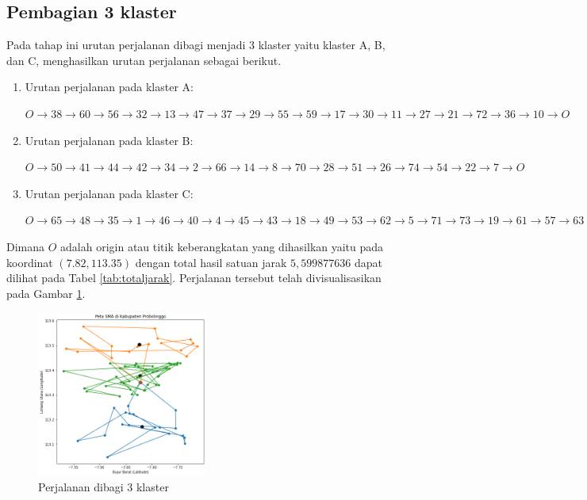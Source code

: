 \subsection{Pembagian 3 klaster}

Pada tahap ini urutan perjalanan dibagi menjadi 3 klaster yaitu klaster A, B, dan C, menghasilkan urutan perjalanan sebagai berikut.

\begin{enumerate}
\item Urutan perjalanan pada klaster A:

$O \to 38 \to 60 \to 56 \to 32 \to 13 \to 47 \to 37 \to 29 \to 55 \to 59 \to 17 \to 30 \to 11 \to 27 \to 21 \to 72 \to 36 \to 10 \to O$

\item Urutan perjalanan pada klaster B:

$O \to 50 \to 41 \to 44 \to 42 \to 34 \to 2 \to 66 \to 14 \to 8 \to 70 \to 28 \to 51 \to 26 \to 74 \to 54 \to 22 \to 7 \to O$

\item Urutan perjalanan pada klaster C:

$O \to 65 \to 48 \to 35 \to 1 \to 46 \to 40 \to 4 \to 45 \to 43 \to 18 \to 49 \to 53 \to 62 \to 5 \to 71 \to 73 \to 19 \to 61 \to 57 \to 63 \to 15 \to 25 \to 68 \to 58 \to 24 \to 31 \to 16 \to 3 \to 12 \to 20 \to 52 \to 67 \to 69 \to 75 \to 39 \to 6 \to 64 \to 23 \to 33 \to 9 \to O$

\end{enumerate}

Dimana $O$ adalah origin atau titik keberangkatan yang dihasilkan yaitu pada koordinat $(7.82, 113.35)$ dengan total hasil satuan jarak $5,599877636$ dapat dilihat pada Tabel \ref{tab:totaljarak}. Perjalanan tersebut telah divisualisasikan pada Gambar \ref{fig:hasil_mtsp3}.

\begin{figure}[H]
\centering
\includegraphics[width=0.5\textwidth]{Gambar/hasil_mtsp/3}
\caption{Perjalanan dibagi 3 klaster}
\label{fig:hasil_mtsp3}
\end{figure}

